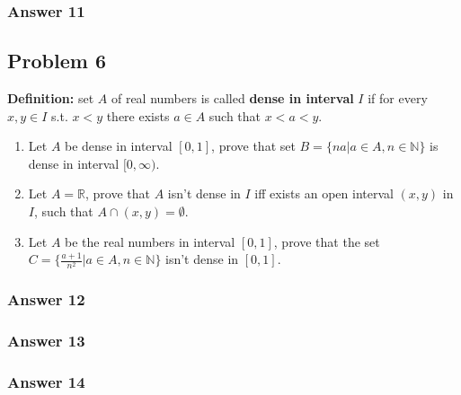 \documentclass[11pt]{article}
\begin{document}
\subsubsection{Answer 11}
\label{sec-1-5-1}
\subsection{Problem 6}
\label{sec-1-6}
\textbf{Definition:} set $A$ of real numbers is called \textbf{dense in interval} $I$ if
for every $x, y \in I$ s.t. $x < y$ there exists $a \in A$ such that
$x < a < y$.

\begin{enumerate}
\item Let $A$ be dense in interval $[0,1]$, prove that set 
      $B=\{na|a \in A, n \in \mathbb{N}\}$ is dense in interval $[0, \infty)$.
\item Let $A=\mathbb{R}$, prove that $A$ isn't dense in $I$ iff exists an
open interval $(x, y)$ in $I$, such that $A \cap (x, y) = \emptyset$.
\item Let $A$ be the real numbers in interval $[0,1]$, prove that the set
      $C=\{\frac{a+1}{n^2} | a \in A, n \in \mathbb{N}\}$ isn't dense in
      $[0,1]$.
\end{enumerate}

\subsubsection{Answer 12}
\label{sec-1-6-1}
\subsubsection{Answer 13}
\label{sec-1-6-2}
\subsubsection{Answer 14}
\label{sec-1-6-3}
\end{document}
